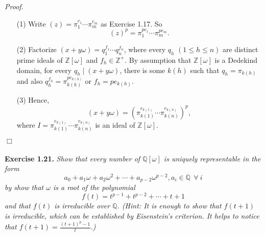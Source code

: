 \documentclass{article}
\begin{document}
\emph{Proof.}
\begin{enumerate}
\item[(1)]
Write $(z) = {\pi}_1^{e_1} \cdots {\pi}_m^{e_m}$ as Exercise 1.17.
So
$$(z)^p = {\pi}_1^{pe_1} \cdots {\pi}_m^{pe_m}.$$
\item[(2)]
Factorize $(x + y\omega) = q_1^{f_1} \cdots q_n^{f_n}$,
where every $q_h$ $(1 \leq h \leq n)$ are distinct prime ideals of $\mathbb{Z}[\omega]$
and $f_h \in \mathbb{Z}^+$.
By assumption that $\mathbb{Z}[\omega]$ is a Dedekind domain,
for every $q_h \mid (x + y\omega)$, there is some $k(h)$ such that $q_h = \pi_{k(h)}$
and also $q_h^{f_h} = \pi_{k(h)}^{pe_{k(h)}}$ or $f_h = pe_{k(h)}$.
\item[(3)]
Hence,
$$(x + y\omega) = \left( \pi_{k(1)}^{e_{k(1)}} \cdots \pi_{k(n)}^{e_{k(n)}} \right)^p,$$
where $I = \pi_{k(1)}^{e_{k(1)}} \cdots \pi_{k(n)}^{e_{k(n)}}$
is an ideal of $\mathbb{Z}[\omega]$.
\end{enumerate}
$\Box$ \\\\






\textbf{Exercise 1.21.}
\emph{Show that every number of $\mathbb{Q}[\omega]$ is uniquely representable in the form
$$a_0 + a_1\omega + a_2\omega^2 + \cdots + a_{p-2}\omega^{p-2},
a_i \in \mathbb{Q} \:\: \forall \: i$$
by show that $\omega$ is a root of the polynomial
$$f(t) = t^{p-1} + t^{p-2} + \cdots + t + 1$$
and that $f(t)$ is irreducible over $\mathbb{Q}$.
(Hint: It is enough to show that $f(t+1)$ is irreducible,
which can be established by Eisenstein's criterion.
It helps to notice that $f(t+1) = \frac{(t+1)^p-1}{t}$.) } \\
\end{document}
